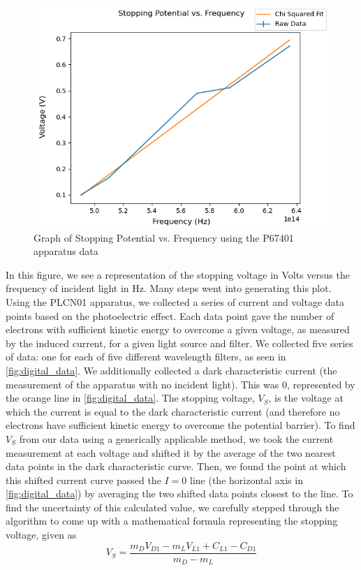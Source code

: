 \documentclass[prX,nofootinbib,notitlepage]{revtex4-1}
\begin{document}
\begin{figure}[ht]
    \centering
    \includegraphics[width=0.75\linewidth]{Stopping_Potential.png}
    \caption{Graph of Stopping Potential vs. Frequency using the P67401 apparatus data}
    \label{fig:stopping_potential}
\end{figure}

In this figure, we see a representation of the stopping voltage in Volts versus the frequency of incident light in Hz. Many steps went into generating this plot.
Using the PLCN01 apparatus, we collected a series of current and voltage data points based on the photoelectric effect. Each data point gave the number of electrons with sufficient kinetic energy to overcome a given voltage, as measured by the induced current, for a given light source and filter. We collected five series of data: one for each of five different wavelength filters, as seen in \ref{fig:digital_data}. We additionally collected a dark characteristic current (the measurement of the apparatus with no incident light). This was 0, represented by the orange line in \ref{fig:digital_data}. The stopping voltage, $V_S$, is the voltage at which the current is equal to the dark characteristic current (and therefore no electrons have sufficient kinetic energy to overcome the potential barrier). To find $V_S$ from our data using a generically applicable method, we took the current measurement at each voltage and shifted it by the average of the two nearest data points in the dark characteristic curve. Then, we found the point at which this shifted current curve passed the $I=0$ line (the horizontal axis in \ref{fig:digital_data}) by averaging the two shifted data points closest to the line. To find the uncertainty of this calculated value, we carefully stepped through the algorithm to come up with a mathematical formula representing the stopping voltage, given as
$$V_{S} = \frac{m_{D} V_{D1} - m_{L} V_{L1} + C_{L1} - C_{D1}}{m_{D} - m_{L}}$$
\end{document}

